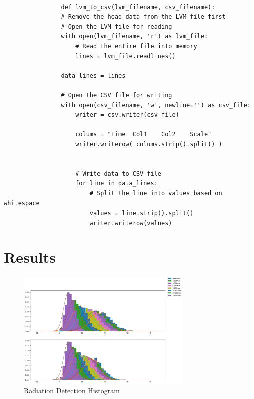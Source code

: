 \documentclass[12pt]{article}
\begin{document}
            \lstset{language=Python}
            \lstset{frame=lines}
            \lstset{basicstyle=\footnotesize}
            \begin{lstlisting}

                def lvm_to_csv(lvm_filename, csv_filename):
                # Remove the head data from the LVM file first
                # Open the LVM file for reading
                with open(lvm_filename, 'r') as lvm_file:
                    # Read the entire file into memory
                    lines = lvm_file.readlines()
            
                data_lines = lines
            
                # Open the CSV file for writing
                with open(csv_filename, 'w', newline='') as csv_file:
                    writer = csv.writer(csv_file)
                    
                    colums = "Time	Col1	Col2	Scale"
                    writer.writerow( colums.strip().split() )
                    
                    
                    # Write data to CSV file
                    for line in data_lines:
                        # Split the line into values based on whitespace
                        values = line.strip().split()
                        writer.writerow(values)
            \end{lstlisting}
                

\section{Results}



    \begin{figure}[!htb]
        \centering
        \includegraphics[width=0.75\textwidth]{./img/plots/thickness.png}
        \caption{Radiation Detection Histogram}
        \label{fig:Radiation Detection Histogram}
    \end{figure}
\end{document}
